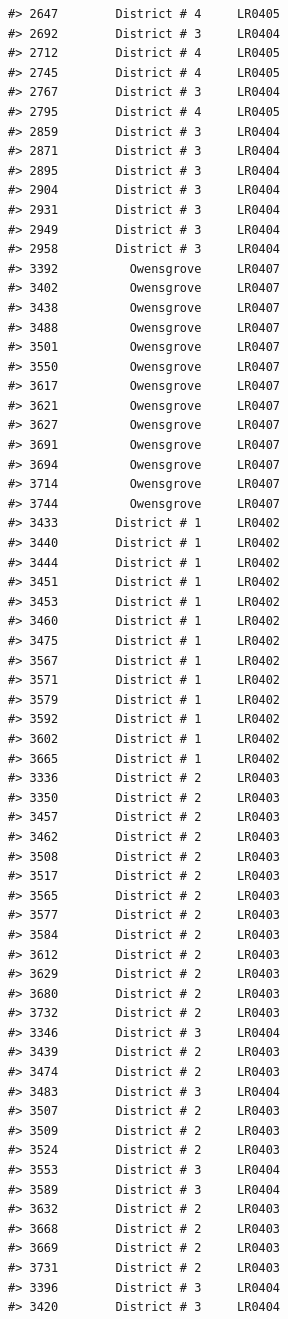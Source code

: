 \documentclass[12pt,a4paper]{book}
\theoremstyle{definition}
\theoremstyle{definition}
\theoremstyle{definition}
\theoremstyle{remark}
\begin{document}
\begin{verbatim}
#> 2647        District # 4     LR0405
#> 2692        District # 3     LR0404
#> 2712        District # 4     LR0405
#> 2745        District # 4     LR0405
#> 2767        District # 3     LR0404
#> 2795        District # 4     LR0405
#> 2859        District # 3     LR0404
#> 2871        District # 3     LR0404
#> 2895        District # 3     LR0404
#> 2904        District # 3     LR0404
#> 2931        District # 3     LR0404
#> 2949        District # 3     LR0404
#> 2958        District # 3     LR0404
#> 3392          Owensgrove     LR0407
#> 3402          Owensgrove     LR0407
#> 3438          Owensgrove     LR0407
#> 3488          Owensgrove     LR0407
#> 3501          Owensgrove     LR0407
#> 3550          Owensgrove     LR0407
#> 3617          Owensgrove     LR0407
#> 3621          Owensgrove     LR0407
#> 3627          Owensgrove     LR0407
#> 3691          Owensgrove     LR0407
#> 3694          Owensgrove     LR0407
#> 3714          Owensgrove     LR0407
#> 3744          Owensgrove     LR0407
#> 3433        District # 1     LR0402
#> 3440        District # 1     LR0402
#> 3444        District # 1     LR0402
#> 3451        District # 1     LR0402
#> 3453        District # 1     LR0402
#> 3460        District # 1     LR0402
#> 3475        District # 1     LR0402
#> 3567        District # 1     LR0402
#> 3571        District # 1     LR0402
#> 3579        District # 1     LR0402
#> 3592        District # 1     LR0402
#> 3602        District # 1     LR0402
#> 3665        District # 1     LR0402
#> 3336        District # 2     LR0403
#> 3350        District # 2     LR0403
#> 3457        District # 2     LR0403
#> 3462        District # 2     LR0403
#> 3508        District # 2     LR0403
#> 3517        District # 2     LR0403
#> 3565        District # 2     LR0403
#> 3577        District # 2     LR0403
#> 3584        District # 2     LR0403
#> 3612        District # 2     LR0403
#> 3629        District # 2     LR0403
#> 3680        District # 2     LR0403
#> 3732        District # 2     LR0403
#> 3346        District # 3     LR0404
#> 3439        District # 2     LR0403
#> 3474        District # 2     LR0403
#> 3483        District # 3     LR0404
#> 3507        District # 2     LR0403
#> 3509        District # 2     LR0403
#> 3524        District # 2     LR0403
#> 3553        District # 3     LR0404
#> 3589        District # 3     LR0404
#> 3632        District # 2     LR0403
#> 3668        District # 2     LR0403
#> 3669        District # 2     LR0403
#> 3731        District # 2     LR0403
#> 3396        District # 3     LR0404
#> 3420        District # 3     LR0404

\end{verbatim}
\end{document}
